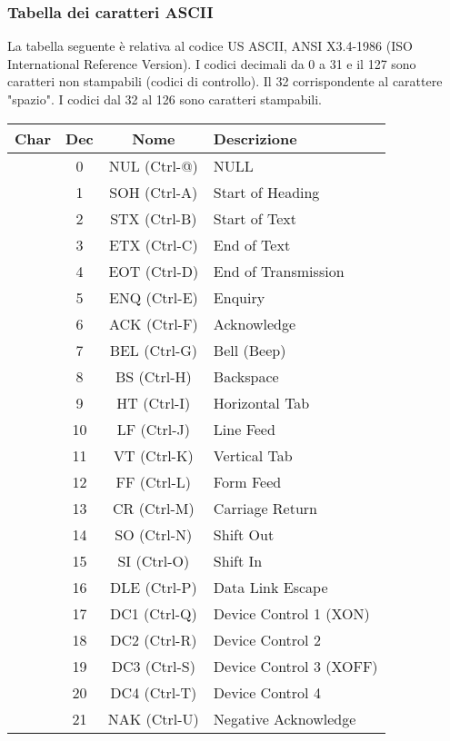 \documentclass[a4paper]{article}
\theoremstyle{break}
\theoremstyle{break}
\theoremstyle{break}
\theoremstyle{break}
\begin{document}
\subsubsection{Tabella dei caratteri ASCII}
La tabella seguente è relativa al codice US ASCII, ANSI X3.4-1986 (ISO International
Reference Version). I codici decimali da 0 a 31 e il 127 sono caratteri non stampabili
(codici di controllo). Il 32 corrispondente al carattere "spazio". I codici dal 32 al 126
sono caratteri stampabili.
\begin{xltabular}{\textwidth}{|c|c|c|l|}
	\hline
	\textbf{Char} & \textbf{Dec} & \textbf{Nome} & \textbf{Descrizione} \\
	\hline
	& 0 & NUL (Ctrl-@) & NULL \\
	\hline
	& 1 & SOH (Ctrl-A) & Start of Heading \\
	\hline
	& 2 & STX (Ctrl-B) & Start of Text \\
	\hline
	& 3 & ETX (Ctrl-C) & End of Text \\
	\hline
	& 4 & EOT (Ctrl-D) & End of Transmission \\
	\hline
	& 5 & ENQ (Ctrl-E) & Enquiry \\
	\hline
	& 6 & ACK (Ctrl-F) & Acknowledge \\
	\hline
	& 7 & BEL (Ctrl-G) & Bell (Beep) \\
	\hline
	& 8 & BS (Ctrl-H) & Backspace \\
	\hline
	& 9 & HT (Ctrl-I) & Horizontal Tab \\
	\hline
	& 10 & LF (Ctrl-J) & Line Feed \\
	\hline
	& 11 & VT (Ctrl-K) & Vertical Tab \\
	\hline
	& 12 & FF (Ctrl-L) & Form Feed \\
	\hline
	& 13 & CR (Ctrl-M) & Carriage Return \\
	\hline
	& 14 & SO (Ctrl-N) & Shift Out \\
	\hline
	& 15 & SI (Ctrl-O) & Shift In \\
	\hline
	& 16 & DLE (Ctrl-P) & Data Link Escape \\
	\hline
	& 17 & DC1 (Ctrl-Q) & Device Control 1 (XON) \\
	\hline
	& 18 & DC2 (Ctrl-R) & Device Control 2 \\
	\hline
	& 19 & DC3 (Ctrl-S) & Device Control 3 (XOFF) \\
	\hline
	& 20 & DC4 (Ctrl-T) & Device Control 4 \\
	\hline
	& 21 & NAK (Ctrl-U) & Negative Acknowledge \\

\end{xltabular}
\end{document}
